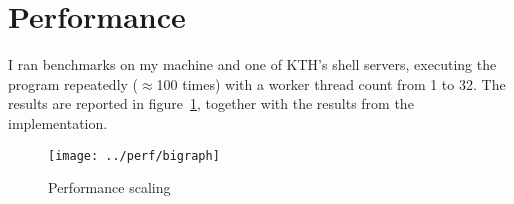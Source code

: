 \documentclass[a4paper, 11pt]{article}
\newcommand*\fig[1]{figure~\ref{fig:#1}}
\begin{document}
\section{Performance}
I ran benchmarks on my machine and one of KTH's shell servers,
executing the program repeatedly ($\approx$100 times) with a worker thread count from 1 to 32.
The results are reported in \fig{perf}, together with the results from the 
implementation.

\vspace{-0.1cm}
\begin{figure}[hb]
	\centering
	\texttt{[image: ../perf/bigraph]}
	\caption{Performance scaling\label{fig:perf}}
\end{figure}
\end{document}
